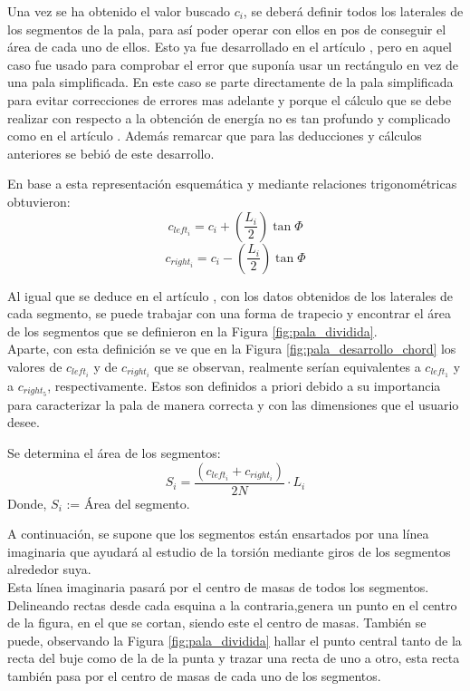 Una vez se ha obtenido el valor buscado $c_i$, se deberá definir todos los laterales de los segmentos de la pala, para así poder operar con ellos en pos de conseguir el área de cada uno de ellos. Esto ya fue desarrollado en el artículo \cite{armenta2021predictive}, pero en aquel caso fue usado para comprobar el error que suponía usar un rectángulo en vez de una pala simplificada. En este caso se parte directamente de la pala simplificada para evitar correcciones de errores mas adelante y porque el cálculo que se debe realizar con respecto a la obtención de energía no es tan profundo y complicado como en el artículo \cite{armenta2021predictive}. Además remarcar que para las deducciones y cálculos anteriores se bebió de este desarrollo.


\begin{definicion}
En base a esta representación esquemática y mediante relaciones trigonométricas obtuvieron:
$$ c_{left_i} = c_i + (\dfrac{L_i}{2}) \tan \varPhi$$
$$ c_{right_i} = c_i - (\dfrac{L_i}{2}) \tan \varPhi$$
\label{def:laterales_segmento}
\end{definicion}

Al igual que se deduce en el artículo \cite{armenta2021predictive}, con los datos obtenidos de los laterales de cada segmento, se puede trabajar con una forma de trapecio y encontrar el área de los segmentos que se definieron en la Figura \ref{fig:pala_dividida}.\\

Aparte, con esta definición se ve que en la Figura \ref{fig:pala_desarrollo_chord} los valores de $c_{left_i}$ y de $c_{right_i}$ que se observan, realmente serían equivalentes a $c_{left_1}$ y a $c_{right_5}$, respectivamente. Estos son definidos a priori debido a su importancia para caracterizar la pala de manera correcta y con las dimensiones que el usuario desee.

\begin{definicion}
Se determina el área de los segmentos:
$$ S_{i} = \dfrac{(c_{left_i} + c_{right_i})}{2N} \cdot L_i $$
Donde,
\centering $S_i$ := Área del segmento.
\label{def:area_segmentos}
\end{definicion}


A continuación, se supone que los segmentos están ensartados por una línea imaginaria que ayudará al estudio de la torsión mediante giros de los segmentos alrededor suya. \\

Esta línea imaginaria pasará por el centro de masas de todos los segmentos. Delineando rectas desde cada esquina a la contraria,genera un punto en el centro de la figura, en el que se cortan, siendo este el centro de masas. También se puede, observando la Figura \ref{fig:pala_dividida} hallar el punto central tanto de la recta del buje como de la de la punta y trazar una recta de uno a otro, esta recta también pasa por el centro de masas de cada uno de los segmentos.\\

